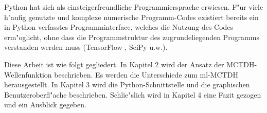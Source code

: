 Python hat sich als einsteigerfreundliche Programmiersprache erwiesen. F"ur viele h"aufig genutzte und komplexe numerische Programm-Codes
existiert bereits ein in Python verfasstes Programminterface, welches die Nutzung des Codes erm"oglicht, ohne dass die Programmstruktur
des zugrundeliegenden Programms verstanden werden muss (TensorFlow \cite{TensorFlow}, SciPy \cite{SciPy} u.w.).
 
Diese Arbeit ist wie folgt gegliedert. In Kapitel 2 wird der Ansatz der MCTDH-Wellenfunk\-tion beschrieben. Es werden die Unterschiede zum ml-MCTDH herausgestellt.
In Kapitel 3 wird die Python-Schnittstelle und die graphischen Benutzeroberfl"ache beschrieben.     
Schlie"slich wird in Kapitel 4 eine Fazit gezogen und ein Ausblick gegeben.     